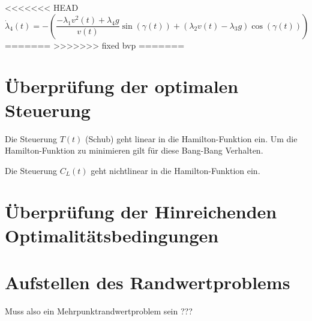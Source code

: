 





<<<<<<< HEAD
\[\dot{\lambda}_4(t) = - \left( \dfrac{- \lambda_1 v^2(t) + \lambda_4 g}{v(t)} \sin(\gamma(t)) + (\lambda_2 v(t) - \lambda_3 g) \cos(\gamma(t)) \right)\]
=======
>>>>>>> fixed bvp
=======

\section{Überprüfung der optimalen Steuerung}
Die Steuerung $T(t)$ (Schub) geht linear in die Hamilton-Funktion ein. Um die Hamilton-Funktion zu minimieren gilt für diese Bang-Bang Verhalten.

Die Steuerung $C_L(t)$ geht nichtlinear in die Hamilton-Funktion ein.






\section{Überprüfung der Hinreichenden Optimalitätsbedingungen}







\section{Aufstellen des Randwertproblems}
Muss also ein Mehrpunktrandwertproblem sein ???


